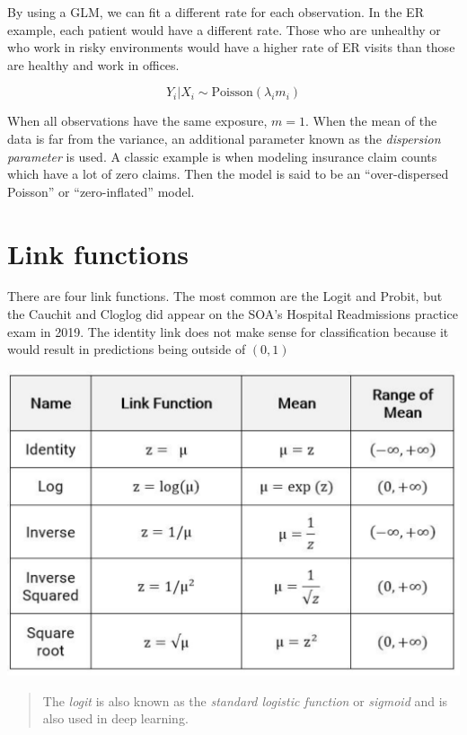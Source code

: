 \documentclass[openany]{book}
\begin{document}
By using a GLM, we can fit a different rate for each observation. In the ER example, each patient would have a different rate. Those who are unhealthy or who work in risky environments would have a higher rate of ER visits than those are healthy and work in offices.

\[Y_i|X_i \sim \text{Poisson}(\lambda_i m_i)\]

When all observations have the same exposure, \(m = 1\). When the mean of the data is far from the variance, an additional parameter known as the \emph{dispersion parameter} is used. A classic example is when modeling insurance claim counts which have a lot of zero claims. Then the model is said to be an ``over-dispersed Poisson'' or ``zero-inflated'' model.

\hypertarget{link-functions}{%
\section{Link functions}\label{link-functions}}

There are four link functions. The most common are the Logit and Probit, but the Cauchit and Cloglog did appear on the SOA's Hospital Readmissions practice exam in 2019. The identity link does not make sense for classification because it would result in predictions being outside of \((0,1)\)

\begin{center}\includegraphics[width=12\linewidth]{images/discrete_link_functions} \end{center}

\begin{quote}
The \emph{logit} is also known as the \emph{standard logistic function} or \emph{sigmoid} and is also used in deep learning.
\end{quote}
\end{document}

